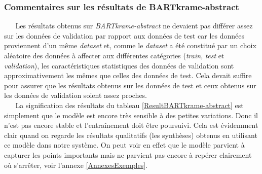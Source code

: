 \subsubsection{Commentaires sur les résultats de BARTkrame-abstract}
$ _{} $ $ _{} $ $ _{} $ $ _{} $ $ _{} $Les résultats obtenus sur \textit{BARTkrame-abstract} ne devaient pas différer assez sur les données de validation par rapport aux données de test car les données proviennent d'un même \textit{dataset} et, comme le \textit{dataset} a été constitué par un choix aléatoire des données à affecter aux différentes catégories (\textit{train}, \textit{test} et \textit{validation}), les caractéristiques statistiques des données de validation sont approximativement les mêmes que celles des données de test. Cela devait suffire pour assurer que les résultats obtenus sur les données de test et ceux obtenus sur les données de validation soient assez proches.\\
$ _{} $ $ _{} $ $ _{} $ $ _{} $ $ _{} $La signification des résultats du tableau \ref{ResultBARTkrame-abstract} est simplement que le modèle est encore très sensible à des petites variations. Donc il n'est pas encore stable et l'entraînement doit être poursuivi. Cela est évidemment clair quand on regarde les résultats qualitatifs (les synthèses) obtenus en utilisant ce modèle dans notre système. On peut voir en effet que le modèle parvient à capturer les points importants mais ne parvient pas encore à repérer clairement où s'arrêter, voir l'annexe \ref{AnnexesExemples}.

